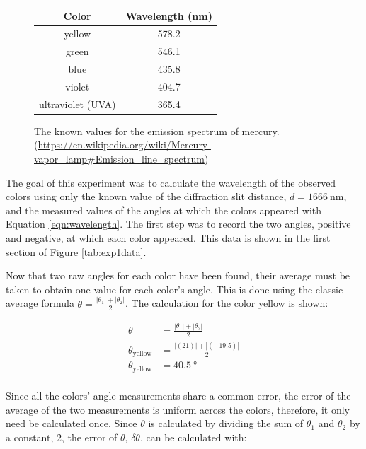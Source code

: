 \documentclass{article}
\begin{document}
\begin{figure}[H]
  \caption{The known values for the emission spectrum of
    mercury. 
    (\url{https://en.wikipedia.org/wiki/Mercury-vapor\_lamp\#Emission\_line\_spectrum})}
  \begin{center}
    \begin{tabular}{|c|c|}
      \hline
      Color & Wavelength (\si{\nano\meter}) \\
      \hline
      yellow            & 578.2 \\
      green             & 546.1 \\
      blue              & 435.8 \\
      violet            & 404.7 \\
      ultraviolet (UVA) & 365.4 \\
      \hline
    \end{tabular}
  \end{center}
  \label{tab:exp1known}
\end{figure}

\qq The goal of this experiment was to calculate the wavelength of the observed
colors using only the known value of the diffraction slit distance, \(d =
\SI{1666}{\nano\meter}\), and the measured values of the angles at which the
colors appeared with Equation \ref{eqn:wavelength}. The first step was to record
the two angles, positive and negative, at which each color appeared. This data is
shown in the first section of Figure \ref{tab:exp1data}. 

\qq Now that two raw angles for each color have been found, their average must
be taken to obtain one value for each color's angle. This is done using the
classic average formula \(\theta = \frac{|\theta_1| + |\theta_2|}{2}\). The
calculation for the color yellow is shown:

\begin{align*}
  \theta                 &= \frac{\left| \theta_1 \right| + \left| \theta_2
                           \right|}{2} \\
  \theta_{\text{yellow}} &= \frac{\left| (21) \right| + \left| (-19.5)
                           \right|}{2} \\
  \theta_{\text{yellow}} &= \SI{40.5}{\degree} \\
\end{align*}

\qq Since all the colors' angle measurements share a common error, the error of
the average of the two measurements is uniform across the colors, therefore, it
only need be calculated once. Since \(\theta\) is calculated by dividing the sum
of \(\theta_1\) and \(\theta_2\) by a constant, \(2\), the error of \(\theta\),
\(\delta \theta\), can be calculated with:
\end{document}

